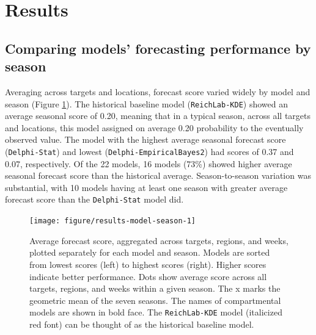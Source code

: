\documentclass{article}\usepackage[]{graphicx}\usepackage[]{color}
\newenvironment{knitrout}{}{} %
\begin{document}
\section{Results}

\subsection{Comparing models' forecasting performance by season}



Averaging across targets and locations, forecast score varied widely by model and season (Figure \ref{fig:results-model-season}). 
The historical baseline model ({\tt ReichLab-KDE}) showed an average seasonal score of 
0.20, 
meaning that in a typical season, across all targets and locations, this model assigned on average 
0.20 
probability to the eventually observed value. 
The model with the highest average seasonal forecast score 
({\tt Delphi-Stat}) 
and lowest 
({\tt Delphi-EmpiricalBayes2}) 
had scores of 0.37 and 0.07, respectively. 
Of the 22 models, 16 models 
(73\%) 
showed higher average seasonal forecast score than the historical average.
Season-to-season variation was substantial, with 
10 
models having at least one season with greater average forecast score than the 
{\tt Delphi-Stat}
model did.

\begin{knitrout}
\color{fgcolor}\begin{figure}
\texttt{[image: figure/results-model-season-1]} \caption[Average forecast score, aggregated across targets, regions, and weeks, plotted separately for each model and season]{Average forecast score, aggregated across targets, regions, and weeks, plotted separately for each model and season. Models are sorted from lowest scores (left) to highest scores (right). Higher scores indicate better performance. Dots show average score across all targets, regions, and weeks within a given season. The x marks the geometric mean of the seven seasons. The names of compartmental models are shown in bold face. The {\tt ReichLab-KDE} model (italicized red font) can be thought of as the historical baseline model.}\label{fig:results-model-season}
\end{figure}


\end{knitrout}


\end{document}
